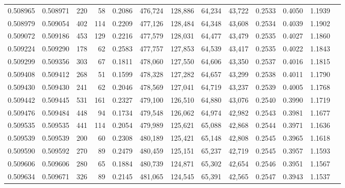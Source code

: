 \begin{tabular}{rrrrrrrrrrrrr}
0.508965 & 0.508971 &   220 &    58 &                                     0.2086 & 476,724 & 128,886 &  64,234 &  43,722 & 0.2533 & 0.4050 & 1.1939 \\
0.508979 & 0.509054 &   402 &   114 &                                     0.2209 & 477,126 & 128,484 &  64,348 &  43,608 & 0.2534 & 0.4039 & 1.1902 \\
0.509072 & 0.509186 &   453 &   129 &                                     0.2216 & 477,579 & 128,031 &  64,477 &  43,479 & 0.2535 & 0.4027 & 1.1860 \\
0.509224 & 0.509290 &   178 &    62 &                                     0.2583 & 477,757 & 127,853 &  64,539 &  43,417 & 0.2535 & 0.4022 & 1.1843 \\
0.509299 & 0.509356 &   303 &    67 &                                     0.1811 & 478,060 & 127,550 &  64,606 &  43,350 & 0.2537 & 0.4016 & 1.1815 \\
0.509408 & 0.509412 &   268 &    51 &                                     0.1599 & 478,328 & 127,282 &  64,657 &  43,299 & 0.2538 & 0.4011 & 1.1790 \\
0.509430 & 0.509430 &   241 &    62 &                                     0.2046 & 478,569 & 127,041 &  64,719 &  43,237 & 0.2539 & 0.4005 & 1.1768 \\
0.509442 & 0.509445 &   531 &   161 &                                     0.2327 & 479,100 & 126,510 &  64,880 &  43,076 & 0.2540 & 0.3990 & 1.1719 \\
0.509476 & 0.509484 &   448 &    94 &                                     0.1734 & 479,548 & 126,062 &  64,974 &  42,982 & 0.2543 & 0.3981 & 1.1677 \\
0.509535 & 0.509535 &   441 &   114 &                                     0.2054 & 479,989 & 125,621 &  65,088 &  42,868 & 0.2544 & 0.3971 & 1.1636 \\
0.509539 & 0.509539 &   200 &    60 &                                     0.2308 & 480,189 & 125,421 &  65,148 &  42,808 & 0.2545 & 0.3965 & 1.1618 \\
0.509590 & 0.509592 &   270 &    89 &                                     0.2479 & 480,459 & 125,151 &  65,237 &  42,719 & 0.2545 & 0.3957 & 1.1593 \\
0.509606 & 0.509606 &   280 &    65 &                                     0.1884 & 480,739 & 124,871 &  65,302 &  42,654 & 0.2546 & 0.3951 & 1.1567 \\
0.509634 & 0.509671 &   326 &    89 &                                     0.2145 & 481,065 & 124,545 &  65,391 &  42,565 & 0.2547 & 0.3943 & 1.1537 \\

\end{tabular}
